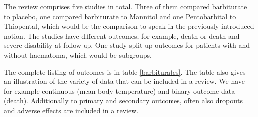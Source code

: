 \documentclass[11pt,a4paper,twoside]{book}\usepackage[]{graphicx}\usepackage[]{color}
\begin{document}
\vspace{0mm}
The review comprises five studies in total. Three of them compared barbiturate to placebo, one compared barbiturate to Mannitol and one Pentobarbital to Thiopental, which would be the comparison to speak in the previously introduced notion. The studies have different outcomes, for example, death or death and severe disability at follow up. One study split up outcomes for patients with and without haematoma, which would be subgroups.

\vspace{0mm}
The complete listing of outcomes is in table \ref{barbiturates}. The table also gives an illustration of the variety of data that can be included in a review. We have for example continuous (mean body temperature) and binary outcome data (death). Additionally to primary and secondary outcomes, often also dropouts and adverse effects are included in a review.
\end{document}
